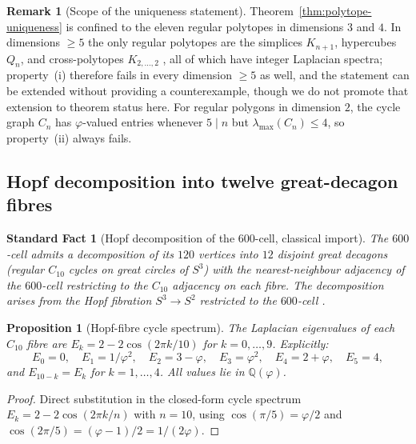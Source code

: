 \documentclass[11pt, a4paper]{amsart}
\newtheorem{proposition}[theorem]{Proposition}
\newtheorem{fact}[theorem]{Standard Fact}
\theoremstyle{definition}
\newtheorem{remark}[theorem]{Remark}
\newcommand{\Q}{\mathbb{Q}}
\begin{document}
\begin{remark}[Scope of the uniqueness statement]
Theorem~\ref{thm:polytope-uniqueness} is confined to the eleven
regular polytopes in dimensions $3$ and $4$. In dimensions $\geq
5$ the only regular polytopes are the simplices $K_{n+1}$,
hypercubes $Q_n$, and cross-polytopes $K_{2,\ldots,2}$
\cite[Ch.~7]{CoxeterRegularPolytopes}, all of which have integer
Laplacian spectra; property~(i) therefore fails in every
dimension $\geq 5$ as well, and the statement can be extended
without providing a counterexample, though we do not promote that
extension to theorem status here. For regular polygons in
dimension $2$, the cycle graph $C_n$ has $\varphi$-valued entries
whenever $5 \mid n$ but $\lambda_{\max}(C_n) \leq 4$, so
property~(ii) always fails.
\end{remark}

\subsection{Hopf decomposition into twelve great-decagon fibres}
\label{sec:hopf-P2}

\begin{fact}[Hopf decomposition of the $600$-cell, classical
import]
\label{fact:hopf}
The $600$-cell admits a decomposition of its $120$ vertices into
$12$ disjoint great decagons (regular $C_{10}$ cycles on great
circles of $S^3$) with the nearest-neighbour adjacency of the
$600$-cell restricting to the $C_{10}$ adjacency on each fibre. The
decomposition arises from the Hopf fibration $S^3 \to S^2$
restricted to the $600$-cell
\cite[\S 22.7]{CoxeterRegularPolytopes}.
\end{fact}

\begin{proposition}[Hopf-fibre cycle spectrum]
\label{prop:hopf-spectrum}
The Laplacian eigenvalues of each $C_{10}$ fibre are
$E_k = 2 - 2\cos(2\pi k / 10)$ for $k = 0, \ldots, 9$. Explicitly:
\[
  E_0 = 0, \quad
  E_1 = 1/\varphi^2, \quad
  E_2 = 3 - \varphi, \quad
  E_3 = \varphi^2, \quad
  E_4 = 2 + \varphi, \quad
  E_5 = 4,
\]
and $E_{10-k} = E_k$ for $k = 1, \ldots, 4$. All values lie in
$\Q(\varphi)$.
\end{proposition}

\begin{proof}
Direct substitution in the closed-form cycle spectrum
$E_k = 2 - 2\cos(2\pi k/n)$ with $n = 10$, using $\cos(\pi/5) =
\varphi/2$ and $\cos(2\pi/5) = (\varphi - 1)/2 = 1/(2\varphi)$.
\end{proof}
\end{document}
